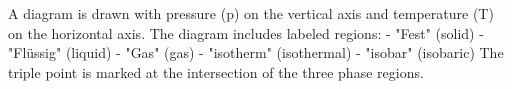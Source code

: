 A diagram is drawn with pressure (p) on the vertical axis and temperature (T) on the horizontal axis. The diagram includes labeled regions:  
- "Fest" (solid)  
- "Flüssig" (liquid)  
- "Gas" (gas)  
- "isotherm" (isothermal)  
- "isobar" (isobaric)  
The triple point is marked at the intersection of the three phase regions.